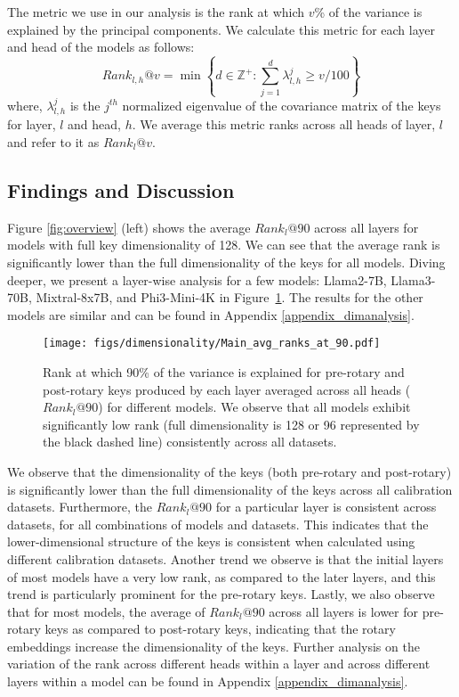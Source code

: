 The metric we use in our analysis is the rank at which $v$\% of the variance is
explained by the principal components. We calculate this metric for each layer
and head of the models as follows:
\begin{equation}
    Rank_{l,h}@v = \min \left\{ d \in \mathbb{Z}^+ : \sum_{j=1}^{d} \lambda_{l,h}^j \geq v/100 \right\}
\end{equation}
where, $\lambda_{l,h}^j$ is the $j^{th}$ normalized eigenvalue of the
covariance matrix of the keys for layer, $l$ and head, $h$. We
average this metric ranks across all heads of layer, $l$ and refer to
it as $Rank_{l}@v$.

\subsection{Findings and Discussion}

Figure \ref{fig:overview} (left) shows the average $Rank_{l}@90$ across all
layers for models with full key dimensionality of 128. We can see that the
average rank is significantly lower than the full dimensionality of the keys
for all models. Diving deeper, we present a layer-wise analysis for a few
models: Llama2-7B, Llama3-70B, Mixtral-8x7B, and Phi3-Mini-4K in
Figure~\ref{fig:rank90}. The results for the other models are similar and can
be found in Appendix \ref{appendix_dimanalysis}. 

\begin{figure}[h]
  \centering
    \texttt{[image: figs/dimensionality/Main\_avg\_ranks\_at\_90.pdf]}

    \caption{Rank at which 90\% of the variance is explained for pre-rotary and
    post-rotary keys produced by each layer averaged across all heads
    ($Rank_{l}@90$) for different models. We observe that all models exhibit
    significantly low rank (full dimensionality is 128 or 96 represented by the black dashed line) consistently across all
    datasets.} \label{fig:rank90}
\end{figure}

We observe that the dimensionality of the keys (both pre-rotary and
post-rotary) is significantly lower than the full dimensionality of the keys
across all calibration datasets. Furthermore, the $Rank_{l}@90$ for a
particular layer is consistent across datasets, for all combinations of models
and datasets. This indicates that the lower-dimensional structure of the keys
is consistent when calculated using different calibration datasets. Another
trend we observe is that the initial layers of most models have a very low
rank, as compared to the later layers, and this trend is particularly prominent
for the pre-rotary keys. Lastly, we also observe that for most models, the
average of $Rank_{l}@90$ across all layers is lower for pre-rotary keys as
compared to post-rotary keys, indicating that the rotary embeddings increase
the dimensionality of the keys.  Further analysis on the variation of the rank
across different heads within a layer and across different layers within a
model can be found in Appendix \ref{appendix_dimanalysis}.

